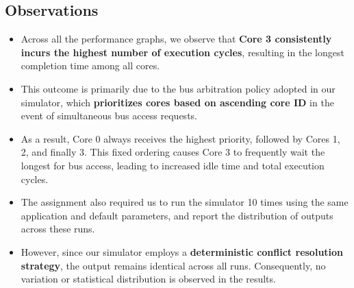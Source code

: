 \documentclass{article}
\begin{document}
\subsection{Observations}

\begin{itemize}
    \item Across all the performance graphs, we observe that \textbf{Core 3 consistently incurs the highest number of execution cycles}, resulting in the longest completion time among all cores.
    
    \item This outcome is primarily due to the bus arbitration policy adopted in our simulator, which \textbf{prioritizes cores based on ascending core ID} in the event of simultaneous bus access requests.
    
    \item As a result, Core 0 always receives the highest priority, followed by Cores 1, 2, and finally 3. This fixed ordering causes Core 3 to frequently wait the longest for bus access, leading to increased idle time and total execution cycles.
    
    \item The assignment also required us to run the simulator 10 times using the same application and default parameters, and report the distribution of outputs across these runs.
    
    \item However, since our simulator employs a \textbf{deterministic conflict resolution strategy}, the output remains identical across all runs. Consequently, no variation or statistical distribution is observed in the results.
\end{itemize}
\end{document}
